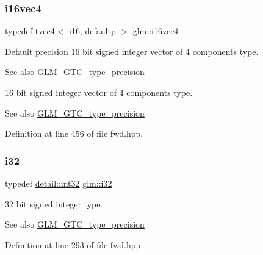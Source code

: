 \subsubsection{\texorpdfstring{i16vec4}{i16vec4}}
{\footnotesize\ttfamily typedef \mbox{\hyperlink{structglm_1_1tvec4}{tvec4}}$<$ \mbox{\hyperlink{group__gtc__type__precision_ga35e5542ca05b29cc256fdafb8503d1fd}{i16}}, \mbox{\hyperlink{namespaceglm_a0f04f086094c747d227af4425893f545a9d21ccd8b5a009ec7eb7677befc3bf51}{defaultp}} $>$ \mbox{\hyperlink{group__gtc__type__precision_gaf074450c0e60b45114084b1df4012a1d}{glm\+::i16vec4}}}

Default precision 16 bit signed integer vector of 4 components type. \begin{DoxySeeAlso}{See also}
\mbox{\hyperlink{group__gtc__type__precision}{G\+L\+M\+\_\+\+G\+T\+C\+\_\+type\+\_\+precision}}
\end{DoxySeeAlso}
16 bit signed integer vector of 4 components type. \begin{DoxySeeAlso}{See also}
\mbox{\hyperlink{group__gtc__type__precision}{G\+L\+M\+\_\+\+G\+T\+C\+\_\+type\+\_\+precision}} 
\end{DoxySeeAlso}


Definition at line 456 of file fwd.\+hpp.

\mbox{\label{group__gtc__type__precision_ga1d8ed5c43e91ea7d4528389da4fa9524}} 
\subsubsection{\texorpdfstring{i32}{i32}}
{\footnotesize\ttfamily typedef \mbox{\hyperlink{namespaceglm_1_1detail_a9f85b4efeca416cdcec2fd08939a2e17}{detail\+::int32}} \mbox{\hyperlink{group__gtc__type__precision_ga1d8ed5c43e91ea7d4528389da4fa9524}{glm\+::i32}}}

32 bit signed integer type. \begin{DoxySeeAlso}{See also}
\mbox{\hyperlink{group__gtc__type__precision}{G\+L\+M\+\_\+\+G\+T\+C\+\_\+type\+\_\+precision}} 
\end{DoxySeeAlso}


Definition at line 293 of file fwd.\+hpp.

\mbox{\label{group__gtc__type__precision_ga05a766bbe2ad0791ed0081baac492da7}} 

